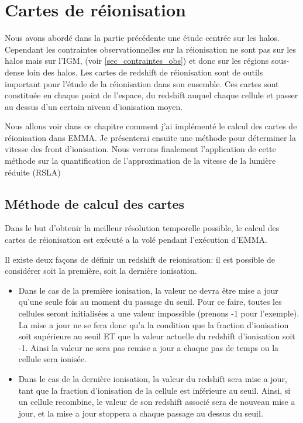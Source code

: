 \chapter{Cartes de réionisation}


Nous avons abordé dans la partie précédente une étude centrée sur les halos.
Cependant les contraintes observationnelles sur la réionisation ne sont pas sur les halos mais sur l'\ac{IGM}, (voir \ref{sec_contraintes_obs}) et donc sur les régions sous-dense loin des halos. 
Les cartes de redshift de réionisation sont de outils important pour l'étude de la réionisation dans son ensemble.
Ces cartes sont constituée en chaque point de l'espace, du redshift auquel chaque cellule et passer au dessus d'un certain niveau d'ionisation moyen.

Nous allons voir dans ce chapitre comment j'ai implémenté le calcul des cartes de réionisation dans EMMA.
Je présenterai ensuite une méthode pour déterminer la vitesse des front d’ionisation.
Nous verrons finalement l’application de cette méthode sur la quantification de l’approximation de la vitesse de la lumière réduite (\ac{RSLA})


\section{Méthode de calcul des cartes}

Dans le but d'obtenir la meilleur résolution temporelle possible, le calcul des cartes de réionisation est exécuté a la volé pendant l'exécution d'EMMA.

Il existe deux façons de définir un redshift de reionisation: il est possible de considérer soit la première, soit la dernière ionisation.


\begin{itemize}
\item Dans le cas de la première ionisation, la valeur ne devra être mise a jour qu'une seule fois au moment du passage du seuil.
Pour ce faire, toutes les cellules seront initialisées a une valeur impossible (prenons -1 pour l'exemple).
La mise a jour ne se fera donc qu'a la condition que la fraction d'ionisation soit supérieure au seuil ET que la valeur actuelle du redshift d'ionisation soit -1.
Ainsi la valeur ne sera pas remise a jour a chaque pas de temps ou la cellule sera ionisée. 

\item Dans le cas de la dernière ionisation, la valeur du redshift sera mise a jour, tant que la fraction d'ionisation de la cellule est inférieure au seuil.
Ainsi, si un cellule recombine, le valeur de son redshift associé sera de nouveau mise a jour, et la mise a jour stoppera a chaque passage au dessus du seuil.
\end{itemize}

